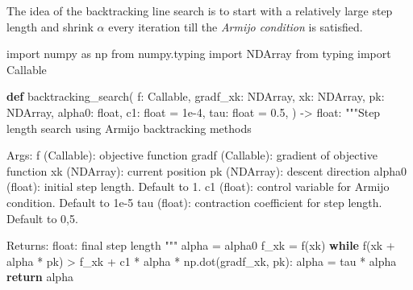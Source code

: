 \documentclass[
  letterpaper,
  DIV=11,
  numbers=noendperiod]{scrreprt}
\newenvironment{Shaded}{\begin{snugshade}}{\end{snugshade}}
\newcommand{\BuiltInTok}[1]{\textcolor[rgb]{0.00,0.23,0.31}{#1}}
\newcommand{\CommentTok}[1]{\textcolor[rgb]{0.37,0.37,0.37}{#1}}
\newcommand{\ControlFlowTok}[1]{\textcolor[rgb]{0.00,0.23,0.31}{\textbf{#1}}}
\newcommand{\FloatTok}[1]{\textcolor[rgb]{0.68,0.00,0.00}{#1}}
\newcommand{\ImportTok}[1]{\textcolor[rgb]{0.00,0.46,0.62}{#1}}
\newcommand{\KeywordTok}[1]{\textcolor[rgb]{0.00,0.23,0.31}{\textbf{#1}}}
\newcommand{\NormalTok}[1]{\textcolor[rgb]{0.00,0.23,0.31}{#1}}
\newcommand{\OperatorTok}[1]{\textcolor[rgb]{0.37,0.37,0.37}{#1}}
\theoremstyle{definition}
\theoremstyle{plain}
\theoremstyle{plain}
\theoremstyle{definition}
\theoremstyle{plain}
\theoremstyle{plain}
\theoremstyle{remark}
\begin{document}
The idea of the backtracking line search is to start with a relatively
large step length and shrink \(\alpha\) every iteration till the
\emph{Armijo condition} is satisfied.

\begin{Shaded}
\begin{Highlighting}[]
\ImportTok{import}\NormalTok{ numpy }\ImportTok{as}\NormalTok{ np}
\ImportTok{from}\NormalTok{ numpy.typing }\ImportTok{import}\NormalTok{ NDArray}
\ImportTok{from}\NormalTok{ typing }\ImportTok{import}\NormalTok{ Callable}

\KeywordTok{def}\NormalTok{ backtracking\_search(}
\NormalTok{    f: Callable,}
\NormalTok{    gradf\_xk: NDArray,}
\NormalTok{    xk: NDArray,}
\NormalTok{    pk: NDArray,}
\NormalTok{    alpha0: }\BuiltInTok{float}\NormalTok{,}
\NormalTok{    c1: }\BuiltInTok{float} \OperatorTok{=} \FloatTok{1e{-}4}\NormalTok{,}
\NormalTok{    tau: }\BuiltInTok{float} \OperatorTok{=} \FloatTok{0.5}\NormalTok{,}
\NormalTok{) }\OperatorTok{{-}\textgreater{}} \BuiltInTok{float}\NormalTok{:}
    \CommentTok{"""Step length search using Armijo backtracking methods}

\CommentTok{    Args:}
\CommentTok{        f (Callable): objective function}
\CommentTok{        gradf (Callable): gradient of objective function}
\CommentTok{        xk (NDArray): current position}
\CommentTok{        pk (NDArray): descent direction}
\CommentTok{        alpha0 (float): initial step length. Default to 1. }
\CommentTok{        c1 (float): control variable for Armijo condition. Default to 1e{-}5}
\CommentTok{        tau (float): contraction coefficient for step length. Default to 0,5. }

\CommentTok{    Returns:}
\CommentTok{        float: final step length}
\CommentTok{    """}
\NormalTok{    alpha }\OperatorTok{=}\NormalTok{ alpha0}
\NormalTok{    f\_xk }\OperatorTok{=}\NormalTok{ f(xk)}
    \ControlFlowTok{while}\NormalTok{ f(xk }\OperatorTok{+}\NormalTok{ alpha }\OperatorTok{*}\NormalTok{ pk) }\OperatorTok{\textgreater{}}\NormalTok{ f\_xk }\OperatorTok{+}\NormalTok{ c1 }\OperatorTok{*}\NormalTok{ alpha }\OperatorTok{*}\NormalTok{ np.dot(gradf\_xk, pk):}
\NormalTok{        alpha }\OperatorTok{=}\NormalTok{ tau }\OperatorTok{*}\NormalTok{ alpha}
    \ControlFlowTok{return}\NormalTok{ alpha}
\end{Highlighting}
\end{Shaded}
\end{document}
